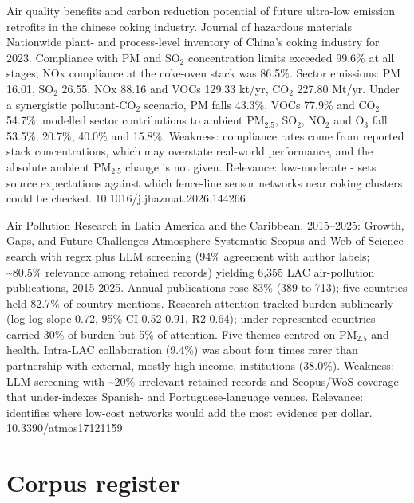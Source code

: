 \documentclass[10pt]{article}
\begin{document}
{Air quality benefits and carbon reduction potential of future ultra-low emission retrofits in the chinese coking industry.}
{Journal of hazardous materials}
{Nationwide plant- and process-level inventory of China's coking industry for 2023. Compliance with PM and SO$_2$ concentration limits exceeded 99.6\% at all stages; NOx compliance at the coke-oven stack was 86.5\%. Sector emissions: PM 16.01, SO$_2$ 26.55, NOx 88.16 and VOCs 129.33 kt/yr, CO$_2$ 227.80 Mt/yr. Under a synergistic pollutant-CO$_2$ scenario, PM falls 43.3\%, VOCs 77.9\% and CO$_2$ 54.7\%; modelled sector contributions to ambient PM$_{2.5}$, SO$_2$, NO$_2$ and O$_3$ fall 53.5\%, 20.7\%, 40.0\% and 15.8\%. Weakness: compliance rates come from reported stack concentrations, which may overstate real-world performance, and the absolute ambient PM$_{2.5}$ change is not given. Relevance: low-moderate - sets source expectations against which fence-line sensor networks near coking clusters could be checked.}
{10.1016/j.jhazmat.2026.144266}

{Air Pollution Research in Latin America and the Caribbean, 2015–2025: Growth, Gaps, and Future Challenges}
{Atmosphere}
{Systematic Scopus and Web of Science search with regex plus LLM screening (94\% agreement with author labels; \textasciitilde{}80.5\% relevance among retained records) yielding 6,355 LAC air-pollution publications, 2015-2025. Annual publications rose 83\% (389 to 713); five countries held 82.7\% of country mentions. Research attention tracked burden sublinearly (log-log slope 0.72, 95\% CI 0.52-0.91, R2 0.64); under-represented countries carried 30\% of burden but 5\% of attention. Five themes centred on PM$_{2.5}$ and health. Intra-LAC collaboration (9.4\%) was about four times rarer than partnership with external, mostly high-income, institutions (38.0\%). Weakness: LLM screening with \textasciitilde{}20\% irrelevant retained records and Scopus/WoS coverage that under-indexes Spanish- and Portuguese-language venues. Relevance: identifies where low-cost networks would add the most evidence per dollar.}
{10.3390/atmos17121159}

\clearpage
\section*{\sffamily\bfseries\color{Deep}Corpus register}
\vspace{-1.5mm}{\color{Amber}\rule{\linewidth}{1.1pt}}\vspace{2.5mm}
\end{document}
